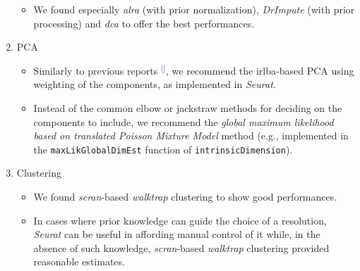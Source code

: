 \documentclass[11pt]{article}
\renewcommand{\cite}[1]{\textcolor{Blue}{$^[$\supercite{#1}$^]$}}
\begin{document}
\begin{enumerate}
\begin{itemize}
       \item We found especially \textit{alra} (with prior normalization), \textit{DrImpute} (with prior processing) and \textit{dca} to offer the best performances.
   \end{itemize}
   \item PCA
   \begin{itemize}
     \item Similarly to previous reports \cite{SunDimRed2019}, we recommend the irlba-based PCA using weighting of the components, as implemented in \textit{Seurat}. 
     \item Instead of the common elbow or jackstraw methods for deciding on the components to include, we recommend the \textit{global maximum likelihood based on translated Poisson Mixture Model} method (e.g., implemented in the  \texttt{maxLikGlobalDimEst} function of \texttt{intrinsicDimension}).
   \end{itemize}
   \item Clustering
   \begin{itemize}
    \item We found \textit{scran}-based \textit{walktrap} clustering to show good performances.
    \item In cases where prior knowledge can guide the choice of a resolution, \textit{Seurat} can be useful in affording manual control of it while, in the absence of such knowledge, \textit{scran}-based \textit{walktrap} clustering provided reasonable estimates.
   \end{itemize}
\end{enumerate}
\end{document}
